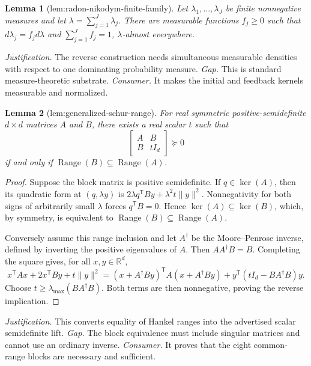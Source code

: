 \documentclass{article}
\newtheorem{lemma}{Lemma}
\begin{document}
\begin{lemma}[lem:radon-nikodym-finite-family]\label{lem:radon-nikodym-finite-family}
Let \(\lambda_1,\ldots,\lambda_J\) be finite nonnegative measures and let
\(\lambda=\sum_{j=1}^J\lambda_j\).  There are measurable functions
\(f_j\ge0\) such that \(d\lambda_j=f_jd\lambda\) and
\(\sum_{j=1}^Jf_j=1\), \(\lambda\)-almost everywhere.
\end{lemma}
\par\smallskip\noindent \textit{Justification.} The reverse construction needs simultaneous measurable densities with respect to one dominating probability measure. \textit{Gap.} This is standard measure-theoretic substrate. \textit{Consumer.} It makes the initial and feedback kernels measurable and normalized.

\begin{lemma}[lem:generalized-schur-range]\label{lem:generalized-schur-range}
For real symmetric positive-semidefinite \(d\times d\) matrices \(A\) and
\(B\), there exists a real scalar \(t\) such that
\[
 \begin{bmatrix}A&B\\B&tI_d\end{bmatrix}\succeq0
\]
if and only if \(\operatorname{Range}(B)\subseteq\operatorname{Range}(A)\).
\end{lemma}
\begin{proof}
Suppose the block matrix is positive semidefinite.  If \(q\in\ker(A)\), then
its quadratic form at \((q,\lambda y)\) is
\(2\lambda q^{\mathsf T}By+\lambda^2t\|y\|^2\).  Nonnegativity for both signs
of arbitrarily small \(\lambda\) forces \(q^{\mathsf T}B=0\).  Hence
\(\ker(A)\subseteq\ker(B)\), which, by symmetry, is equivalent to
\(\operatorname{Range}(B)\subseteq\operatorname{Range}(A)\).

Conversely assume this range inclusion and let \(A^\dagger\) be the
Moore--Penrose inverse, defined by inverting the positive eigenvalues of
\(A\).  Then \(AA^\dagger B=B\).  Completing the square gives, for all
\(x,y\in\mathbb R^d\),
\[
 x^{\mathsf T}Ax+2x^{\mathsf T}By+t\|y\|^2
 =(x+A^\dagger By)^{\mathsf T}A(x+A^\dagger By)
   +y^{\mathsf T}(tI_d-BA^\dagger B)y.
\]
Choose \(t\ge\lambda_{\max}(BA^\dagger B)\).  Both terms are then
nonnegative, proving the reverse implication.
\end{proof}
\par\smallskip\noindent \textit{Justification.} This converts equality of Hankel ranges into the advertised scalar semidefinite lift. \textit{Gap.} The block equivalence must include singular matrices and cannot use an ordinary inverse. \textit{Consumer.} It proves that the eight common-range blocks are necessary and sufficient.
\end{document}
